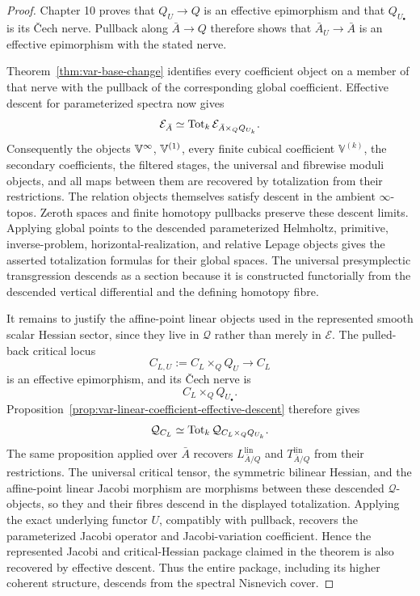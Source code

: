 \begin{proof}
Chapter 10 proves that \(Q_U\to Q\) is an effective epimorphism and that \(Q_{U_\bullet}\) is its \v{C}ech nerve. Pullback along \(\bar A\to Q\) therefore shows that \(\bar A_U\to\bar A\) is an effective epimorphism with the stated nerve.

Theorem~\ref{thm:var-base-change} identifies every coefficient object on a member of that nerve with the pullback of the corresponding global coefficient. Effective descent for parameterized spectra now gives
\[
    \mathcal E_{\bar A}
    \simeq
    \operatorname{Tot}_k\mathcal E_{\bar A\times_QQ_{U_k}}.
\]
Consequently the objects \(\mathbb V^{\infty}\), \(\mathbb V^{(1)}\), every finite cubical coefficient \(\mathbb V^{(k)}\), the secondary coefficients, the filtered stages, the universal and fibrewise moduli objects, and all maps between them are recovered by totalization from their restrictions. The relation objects themselves satisfy descent in the ambient \(\infty\)-topos. Zeroth spaces and finite homotopy pullbacks preserve these descent limits. Applying global points to the descended parameterized Helmholtz, primitive, inverse-problem, horizontal-realization, and relative Lepage objects gives the asserted totalization formulas for their global spaces.  The universal presymplectic transgression descends as a section because it is constructed functorially from the descended vertical differential and the defining homotopy fibre.

It remains to justify the affine-point linear objects used in the represented smooth scalar Hessian sector, since they live in \(\mathcal Q\) rather than merely in \(\mathcal E\).  The pulled-back critical locus
\[
    C_{L,U}
    :=
    C_L\times_QQ_U
    \longrightarrow
    C_L
\]
is an effective epimorphism, and its \v{C}ech nerve is
\[
    C_L\times_QQ_{U_\bullet}.
\]
Proposition~\ref{prop:var-linear-coefficient-effective-descent} therefore gives
\[
    \mathcal Q_{C_L}
    \simeq
    \operatorname{Tot}_k
    \mathcal Q_{C_L\times_QQ_{U_k}}.
\]
The same proposition applied over \(\bar A\) recovers
\(L^{\mathrm{lin}}_{\bar A/Q}\) and
\(T^{\mathrm{lin}}_{\bar A/Q}\) from their restrictions.  The universal critical tensor, the symmetric bilinear Hessian, and the affine-point linear Jacobi morphism are morphisms between these descended \(\mathcal Q\)-objects, so they and their fibres descend in the displayed totalization.  Applying the exact underlying functor \(U\), compatibly with pullback, recovers the parameterized Jacobi operator and Jacobi-variation coefficient.  Hence the represented Jacobi and critical-Hessian package claimed in the theorem is also recovered by effective descent.  Thus the entire package, including its higher coherent structure, descends from the spectral Nisnevich cover.
\end{proof}

